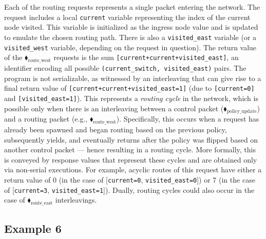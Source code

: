 Each of the routing requests represents a single packet entering the network. The request includes a local \texttt{current} variable representing the index of the current node visited. This variable is initialized as the ingress node value and is updated to emulate the chosen routing path. There is also a \texttt{visited\_east} variable (or a \texttt{visited\_west} variable, depending on the request in question).
%
The return value of the {\color{ForestGreen}$\blacklozenge_\text{route\_west}$} requests is the sum \texttt{[current+current+visited\_east]}, an identifier encoding all possible \texttt{(current\_switch, visited\_east)} pairs.
%
The program is not serializable, as witnessed by an interleaving that can give rise to a final return value of \texttt{[current+current+visited\_east=1]} (due to \texttt{[current=0]} and \texttt{[visited\_east=1]}). This represents a \textit{routing cycle} in the network, which is possible only when there is an interleaving between a control packet ({\color{ForestGreen}$\blacklozenge_\text{policy\_update}$}) and a routing packet (e.g., {\color{ForestGreen}$\blacklozenge_\text{route\_west}$}). Specifically, this occurs when a request has already been spawned and began routing based on the previous policy, subsequently yields, and eventually returns after the policy was flipped based on another control packet --- hence resulting in a routing cycle.
%
More formally, this is conveyed by response values that represent these cycles and are obtained only via non-serial executions. For example, acyclic routes of this request have either a return value of 0 (in the case of [\texttt{current=0}, \texttt{visited\_east=0}]) or 7 (in the case of [\texttt{current=3}, \texttt{visited\_east=1}]).
Dually, routing cycles could also occur in the case of {\color{ForestGreen}$\blacklozenge_\text{route\_east}$} interleavings.


\subsection{Example 6}


